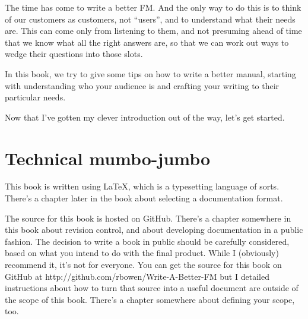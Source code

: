 The time has come to write a better FM. And the only way to do this is
to think of our customers as customers, not ``users'', and to understand
what their needs are. This can come only from listening to them, and not
presuming ahead of time that we know what all the right answers are, so
that we can work out ways to wedge their questions into those slots.

In this book, we try to give some tips on how to write a better manual,
starting with understanding who your audience is and crafting your
writing to their particular needs.

Now that I've gotten my clever introduction out of the way, let's get
started.

\section{Technical mumbo-jumbo}

This book is written using LaTeX, which is a typesetting language of
sorts. There's a chapter later in the book about selecting a
documentation format.

The source for this book is hosted on GitHub. There's a chapter
somewhere in this book about revision control, and about developing
documentation in a public fashion. The decision to write a book in
public should be carefully considered, based on what you intend to do
with the final product. While I (obviously) recommend it, it's not for
everyone. You can get the source for this book on GitHub at
http://github.com/rbowen/Write-A-Better-FM but I detailed instructions
about how to turn that source into a useful document are outside of the
scope of this book. There's a chapter somewhere about defining your
scope, too.

